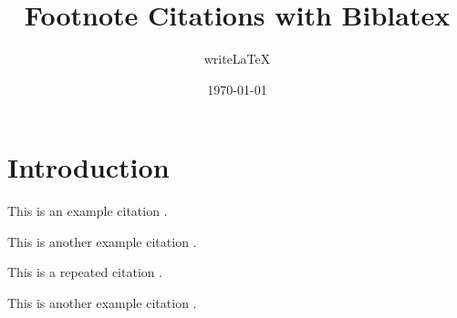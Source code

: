 \documentclass[a4paper,12pt]{article}
\title{Footnote Citations with Biblatex}
\author{writeLaTeX}
\date{\today}
\begin{document}
\maketitle

\section{Introduction}

This is an example citation \autocite{ginsberg}.
\lipsum[1] %

This is another example citation \autocite{brassard}.
\lipsum[2] %

This is a repeated citation \autocite{brassard}.
\lipsum[3] %

This is another example citation \autocite{adorf}.
\lipsum[4] %

\printbibliography
\end{document}
